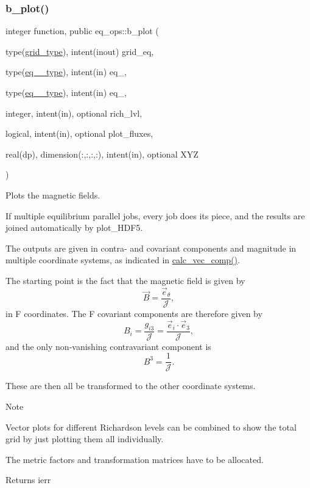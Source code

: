 \subsubsection{\texorpdfstring{b\+\_\+plot()}{b\_plot()}}
{\footnotesize\ttfamily integer function, public eq\+\_\+ops\+::b\+\_\+plot (\begin{DoxyParamCaption}\item[{type(\hyperlink{structgrid__vars_1_1grid__type}{grid\+\_\+type}), intent(inout)}]{grid\+\_\+eq,  }\item[{type(\hyperlink{structeq__vars_1_1eq__1__type}{eq\+\_\+1\+\_\+type}), intent(in)}]{eq\+\_,  }\item[{type(\hyperlink{structeq__vars_1_1eq__2__type}{eq\+\_\+2\+\_\+type}), intent(in)}]{eq\+\_,  }\item[{integer, intent(in), optional}]{rich\+\_\+lvl,  }\item[{logical, intent(in), optional}]{plot\+\_\+fluxes,  }\item[{real(dp), dimension(\+:,\+:,\+:,\+:), intent(in), optional}]{X\+YZ }\end{DoxyParamCaption})}



Plots the magnetic fields. 

If multiple equilibrium parallel jobs, every job does its piece, and the results are joined automatically by plot\+\_\+\+H\+D\+F5.

The outputs are given in contra-\/ and covariant components and magnitude in multiple coordinate systems, as indicated in \hyperlink{namespacegrid__utilities_ad3d9386b9abcb1a7e17369a1b3a3750d}{calc\+\_\+vec\+\_\+comp()}.

The starting point is the fact that the magnetic field is given by \[\vec{B} = \frac{\vec{e}_{\theta}}{\mathcal{J}}, \] in F coordinates. The F covariant components are therefore given by \[B_i = \frac{g_{i3}}{\mathcal{J}} = \frac{\vec{e}_i \cdot \vec{e}_3}{\mathcal{J}}, \] and the only non-\/vanishing contravariant component is \[B^3 = \frac{1}{\mathcal{J}}. \]

These are then all be transformed to the other coordinate systems.

\begin{DoxyNote}{Note}

\begin{DoxyEnumerate}
\item Vector plots for different Richardson levels can be combined to show the total grid by just plotting them all individually.
\item The metric factors and transformation matrices have to be allocated.
\end{DoxyEnumerate}
\end{DoxyNote}
\begin{DoxyReturn}{Returns}
ierr
\end{DoxyReturn}


